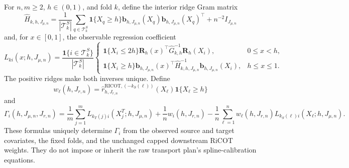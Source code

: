 For \(n,m\ge2\), \(h\in(0,1)\), and fold \(k\), define the interior ridge Gram matrix
\[
\widehat H_{k,h,J_{\mu,n}}
=\frac1{|\mathcal T^S_k|}\sum_{q\in\mathcal T^S_k}
\mathbf 1\{X_q\ge h\}\mathbf b_{h,J_{\mu,n}}(X_q)\mathbf b_{h,J_{\mu,n}}(X_q)^\top+n^{-2}I_{J_{\mu,n}}
\]
and, for \(x\in[0,1]\), the observable regression coefficient
\[
L_{k i}(x;h,J_{\mu,n})=
\frac{\mathbf 1\{i\in\mathcal T^S_k\}}{|\mathcal T^S_k|}
\begin{cases}
\mathbf 1\{X_i\le2h\}\mathbf R_h(x)^\top\widehat G_{k,h}^{-1}\mathbf R_h(X_i),&0\le x<h,\\
\mathbf 1\{X_i\ge h\}\mathbf b_{h,J_{\mu,n}}(x)^\top\widehat H_{k,h,J_{\mu,n}}^{-1}\mathbf b_{h,J_{\mu,n}}(X_i),&h\le x\le1.
\end{cases}
\]
The positive ridges make both inverses unique. Define
\[
w_\ell(h,J_{r,n})=
\widehat r^{\mathrm{RICOT},(-k_S(\ell))}_{h,J_{r,n}}(X_\ell)\mathbf 1\{X_\ell\ge h\}
\]
and
\[
\Gamma_i(h,J_{\mu,n},J_{r,n})
=\frac1m\sum_{j=1}^m L_{k_T(j)i}(X_j^T;h,J_{\mu,n})
+\frac1n w_i(h,J_{r,n})
-\frac1n\sum_{\ell=1}^n w_\ell(h,J_{r,n})L_{k_S(\ell)i}(X_\ell;h,J_{\mu,n}).
\]
These formulas uniquely determine \(\Gamma_i\) from the observed source and target covariates, the fixed folds, and the unchanged capped downstream RiCOT weights. They do not impose or inherit the raw transport plan's spline-calibration equations.